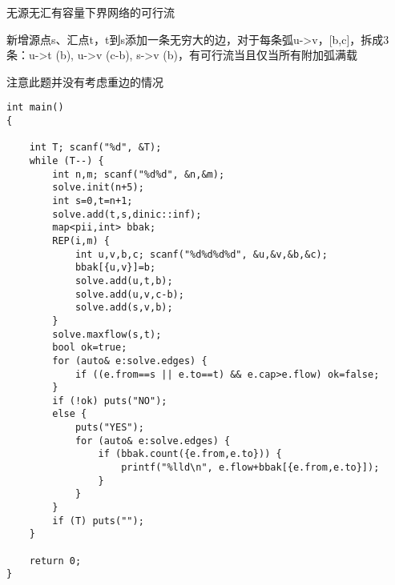 无源无汇有容量下界网络的可行流

新增源点s、汇点t，t到s添加一条无穷大的边，对于每条弧u->v，[b,c]，拆成3条：u->t (b), u->v (c-b), s->v (b)，有可行流当且仅当所有附加弧满载

注意此题并没有考虑重边的情况

\begin{lstlisting}
int main()
{

    int T; scanf("%d", &T);
    while (T--) {
        int n,m; scanf("%d%d", &n,&m);
        solve.init(n+5);
        int s=0,t=n+1;
        solve.add(t,s,dinic::inf);
        map<pii,int> bbak;
        REP(i,m) {
            int u,v,b,c; scanf("%d%d%d%d", &u,&v,&b,&c);
            bbak[{u,v}]=b;
            solve.add(u,t,b);
            solve.add(u,v,c-b);
            solve.add(s,v,b);
        }
        solve.maxflow(s,t);
        bool ok=true;
        for (auto& e:solve.edges) {
            if ((e.from==s || e.to==t) && e.cap>e.flow) ok=false;
        }
        if (!ok) puts("NO");
        else {
            puts("YES");
            for (auto& e:solve.edges) {
                if (bbak.count({e.from,e.to})) {
                    printf("%lld\n", e.flow+bbak[{e.from,e.to}]);
                }
            }
        }
        if (T) puts("");
    }

    return 0;
}
\end{lstlisting}